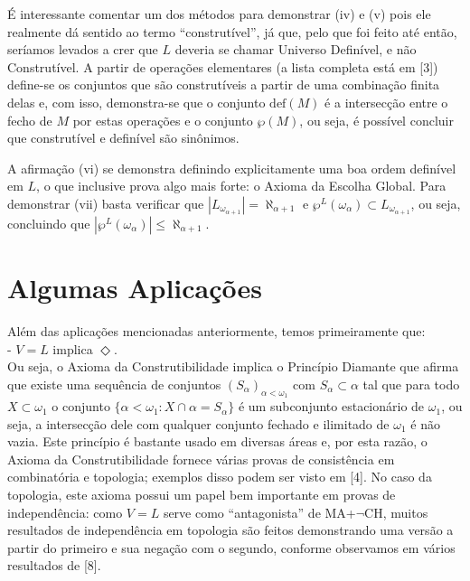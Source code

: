 \documentclass[11pt,a4paper]{article}
\theoremstyle{definition}
\begin{document}
É interessante comentar um dos métodos para demonstrar (iv) e (v) pois ele realmente dá sentido ao termo ``construtível'', já que, pelo que foi feito até então, seríamos levados a crer que $L$ deveria se chamar Universo Definível, e não Construtível. A partir de operações elementares (a lista completa está em [3]) define-se os conjuntos que são construtíveis a partir de uma combinação finita delas e, com isso, demonstra-se que o conjunto $\text{def}(M)$ é a intersecção entre o fecho de $M$ por estas operações e o conjunto $\wp(M)$, ou seja, é possível concluir que construtível e definível são sinônimos. 

A afirmação (vi) se demonstra definindo explicitamente uma boa ordem definível em $L$, o que inclusive prova algo mais forte: o Axioma da Escolha Global. Para demonstrar (vii) basta verificar que $|L_{\omega_{\alpha+1}}|=\aleph_{\alpha+1}$ e $\wp^L (\omega_\alpha)\subset L_{\omega_{\alpha+1}}$, ou seja, concluindo que $|\wp^L (\omega_\alpha)|\leq \aleph_{\alpha+1}$.

\section{Algumas Aplicações}

Além das aplicações mencionadas anteriormente, temos primeiramente que: \\

- $V=L$ implica $\Diamond$. \\

Ou seja, o Axioma da Construtibilidade implica o Princípio Diamante que afirma que existe uma sequência de conjuntos $(S_\alpha)_{\alpha<\omega_1}$ com $S_\alpha \subset \alpha$ tal que para todo $X\subset \omega_1$ o conjunto $\{ \alpha < \omega_1 : X\cap \alpha = S_\alpha \}$ é um subconjunto estacionário de $\omega_1$, ou seja, a intersecção dele com qualquer conjunto fechado e ilimitado de $\omega_1$ é não vazia. Este princípio é bastante usado em diversas áreas e, por esta razão, o Axioma da Construtibilidade fornece várias provas de consistência em combinatória e topologia; exemplos disso podem ser visto em [4]. No caso da topologia, este axioma possui um papel bem importante em provas de independência: como $V=L$ serve como ``antagonista'' de MA+$\neg$CH, muitos resultados de independência em topologia são feitos demonstrando uma versão a partir do primeiro e sua negação com o segundo, conforme observamos em vários resultados de [8]. \\  
\end{document}
